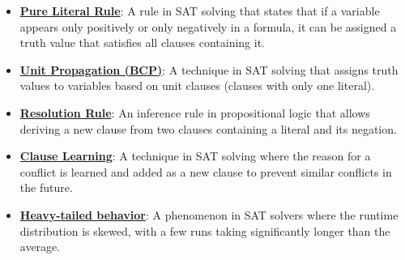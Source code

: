 \documentclass{article}%
\begin{document}
\begin{itemize}[leftmargin=*]
\item \href{https://purdue.brightspace.com/d2l/common/assets/pdfjs-d2l-dist/1.0.14-legacy/web/viewer.html?file=%2Fcontent%2Fenforced%2F1095467-wl.202510.CS.24300.001%2F15L2-SAT.pdf%3Fou%3D1095467&lang=en-us&container=d2l-fileviewer-rendered-pdf&fullscreen=d2l-fileviewer-rendered-pdf-dialog&height=667#page=19}{\textbf{Pure Literal Rule}}: A rule in SAT solving that states that if a variable appears only positively or only negatively in a formula, it can be assigned a truth value that satisfies all clauses containing it.%
\item \href{https://purdue.brightspace.com/d2l/common/assets/pdfjs-d2l-dist/1.0.14-legacy/web/viewer.html?file=%2Fcontent%2Fenforced%2F1095467-wl.202510.CS.24300.001%2F15L2-SAT.pdf%3Fou%3D1095467&lang=en-us&container=d2l-fileviewer-rendered-pdf&fullscreen=d2l-fileviewer-rendered-pdf-dialog&height=667#page=20}{\textbf{Unit Propagation (BCP)}}: A technique in SAT solving that assigns truth values to variables based on unit clauses (clauses with only one literal).%
\item \href{https://purdue.brightspace.com/d2l/common/assets/pdfjs-d2l-dist/1.0.14-legacy/web/viewer.html?file=%2Fcontent%2Fenforced%2F1095467-wl.202510.CS.24300.001%2F15L2-SAT.pdf%3Fou%3D1095467&lang=en-us&container=d2l-fileviewer-rendered-pdf&fullscreen=d2l-fileviewer-rendered-pdf-dialog&height=667#page=32}{\textbf{Resolution Rule}}: An inference rule in propositional logic that allows deriving a new clause from two clauses containing a literal and its negation.%
\item \href{https://purdue.brightspace.com/d2l/common/assets/pdfjs-d2l-dist/1.0.14-legacy/web/viewer.html?file=%2Fcontent%2Fenforced%2F1095467-wl.202510.CS.24300.001%2F15L2-SAT.pdf%3Fou%3D1095467&lang=en-us&container=d2l-fileviewer-rendered-pdf&fullscreen=d2l-fileviewer-rendered-pdf-dialog&height=667#page=34}{\textbf{Clause Learning}}: A technique in SAT solving where the reason for a conflict is learned and added as a new clause to prevent similar conflicts in the future.%
\item \href{https://purdue.brightspace.com/d2l/common/assets/pdfjs-d2l-dist/1.0.14-legacy/web/viewer.html?file=%2Fcontent%2Fenforced%2F1095467-wl.202510.CS.24300.001%2F15L2-SAT.pdf%3Fou%3D1095467&lang=en-us&container=d2l-fileviewer-rendered-pdf&fullscreen=d2l-fileviewer-rendered-pdf-dialog&height=667#page=35}{\textbf{Heavy{-}tailed behavior}}: A phenomenon in SAT solvers where the runtime distribution is skewed, with a few runs taking significantly longer than the average.%

\end{itemize}
\end{document}
